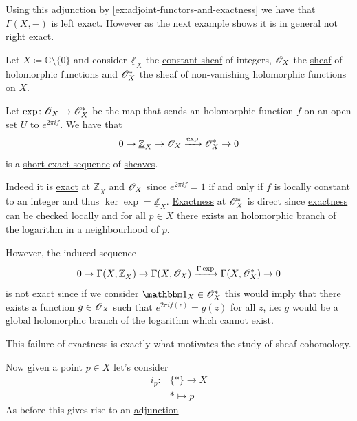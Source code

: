 \documentclass[../../main]{subfiles}
\begin{document}
Using this adjunction by \autoref{ex:adjoint-functors-and-exactness} we have that \(\Gamma(X, -)\) is \hyperref[def:exact-functor]{left exact}.
However as the next example shows it is in general not \hyperref[def:exact-functor]{right exact}.
\begin{example}
  Let \(X \coloneq \mathbb{C} \setminus \{0\}\) and consider \(\underline{\mathbb{Z}}_{X}\) the \hyperref[def:constant-sheaf]{constant sheaf} of integers, \(\mathscr{O}_{X}\) the \hyperref[def:sheaf]{sheaf} of holomorphic functions and \(\mathscr{O}_{X}^{\ast}\) the  \hyperref[def:sheaf]{sheaf} of non-vanishing holomorphic functions on \(X\).

  Let \(\exp\colon \mathscr{O}_{X} \to \mathscr{O}_{X}^{\ast}\) be the map that sends an holomorphic function \(f\) on an open set \(U\) to \(e^{2\pi i f}\).
  We have that
  \begin{equation*}
    0 \to \underline{\mathbb{Z}}_{X} \to \mathscr{O}_{X} \xrightarrow{\exp} \mathscr{O}_{X}^{\ast} \to 0
  \end{equation*}
  is a \hyperref[def:exact-sequence]{short exact sequence} of \hyperref[def:sheaf]{sheaves}.

  Indeed it is \hyperref[def:exact-sequence]{exact} at \(\underline{\mathbb{Z}}_{X}\) and \(\mathscr{O}_{X}\) since \(e^{2\pi i f} = 1\) if and only if \(f\) is locally constant to an integer and thus \(\ker \exp = \underline{\mathbb{Z}}_{X}\).
  \hyperref[def:exact-sequence]{Exactness} at \(\mathscr{O}_{X}^{\ast}\) is direct since \hyperref[cor:exactness-at-stalks]{exactness can be checked locally} and for all \(p \in X\) there exists an holomorphic branch of the logarithm in a neighbourhood of \(p\).

  However, the induced sequence
  \begin{equation*}
    0 \to \Gamma(X, \underline{\mathbb{Z}}_{X}) \to \Gamma(X, \mathscr{O}_{X}) \xrightarrow{\Gamma\exp} \Gamma(X, \mathscr{O}_{X}^{\ast}) \to 0
  \end{equation*}
  is not \hyperref[def:exact-sequence]{exact} since if we consider \(\id_{X} \in \sheaf{O}_{X}^{\ast}\) this would imply that there exists a function \(g \in \mathscr{O}_{X}\) such that \(e^{2\pi i f(z)} = g(z)\) for all \(z\), i.e: \(g\) would be a global holomorphic branch of the logarithm which cannot exist.
\end{example}

This failure of exactness is exactly what motivates the study of sheaf cohomology.

Now given a point \(p \in X\) let's consider
\begin{align*}
  i_{p}\colon& \{\ast\} \to X \\
        & \ast \mapsto p
\end{align*}
As before this gives rise to an \hyperref[def:adjoint-functors]{adjunction}
\begin{center}
\end{center}
\end{document}
